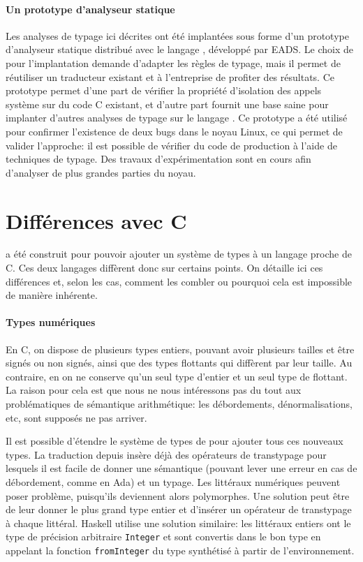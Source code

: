 \paragraph{Un prototype d'analyseur statique}

Les analyses de typage ici décrites ont été implantées sous forme d'un prototype
d'analyseur statique distribué avec le langage \newspeak, développé par EADS. Le
choix de \newspeak pour l'implantation demande d'adapter les règles de typage,
mais il permet de réutiliser un traducteur existant et à l'entreprise de
profiter des résultats. Ce prototype permet d'une part de vérifier la propriété
d'isolation des appels système sur du code C existant, et d'autre part fournit
une base saine pour implanter d'autres analyses de typage sur le langage
\newspeak. Ce prototype a été utilisé pour confirmer l'existence de deux bugs
dans le noyau Linux, ce qui permet de valider l'approche: il est possible de
vérifier du code de production à l'aide de techniques de typage. Des travaux
d'expérimentation sont en cours afin d'analyser de plus grandes parties du
noyau.

\section{Différences avec C}

\langname a été construit pour pouvoir ajouter un système de types à un langage
proche de C. Ces deux langages diffèrent donc sur certains points. On détaille
ici ces différences et, selon les cas, comment les combler ou pourquoi cela est
impossible de manière inhérente.

\paragraph{Types numériques}

En C, on dispose de plusieurs types entiers, pouvant avoir plusieurs tailles et
être signés ou non signés, ainsi que des types flottants qui diffèrent par leur
taille. Au contraire, en \langname{} on ne conserve qu'un seul type d'entier et
un seul type de flottant. La raison pour cela est que nous ne nous intéressons
pas du tout aux problématiques de sémantique arithmétique: les débordements,
dénormalisations, etc, sont supposés ne pas arriver.

Il est possible d'étendre le système de types de \langname{} pour ajouter tous
ces nouveaux types. La traduction depuis \newspeak insère déjà des opérateurs de
transtypage pour lesquels il est facile de donner une sémantique (pouvant lever
une erreur en cas de débordement, comme en Ada) et un typage. Les littéraux
numériques peuvent poser problème, puisqu'ils deviennent alors polymorphes. Une
solution peut être de leur donner le plus grand type entier et d'insérer un
opérateur de transtypage à chaque littéral. Haskell utilise une solution
similaire: les littéraux entiers ont le type de précision arbitraire
\texttt{Integer} et sont convertis dans le bon type en appelant la fonction
\texttt{fromInteger} du type synthétisé à partir de l'environnement.

